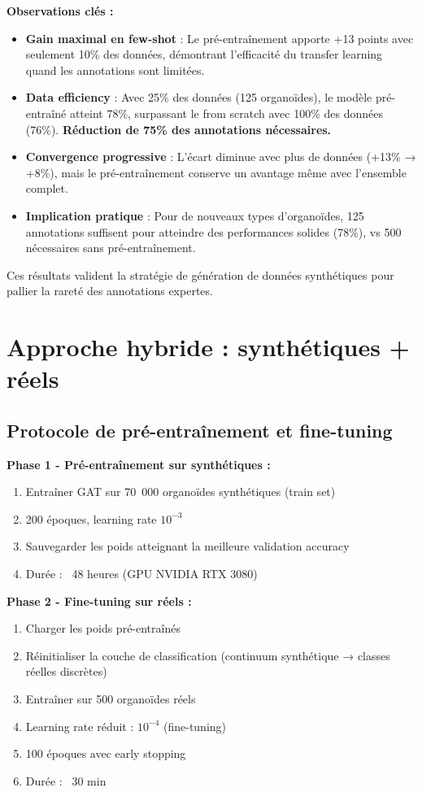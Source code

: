\textbf{Observations clés :}
\begin{itemize}
    \item \textbf{Gain maximal en few-shot} : Le pré-entraînement apporte +13 points avec seulement 10\% des données, démontrant l'efficacité du transfer learning quand les annotations sont limitées.
    
    \item \textbf{Data efficiency} : Avec 25\% des données (125 organoïdes), le modèle pré-entraîné atteint 78\%, surpassant le from scratch avec 100\% des données (76\%). \textbf{Réduction de 75\% des annotations nécessaires.}
    
    \item \textbf{Convergence progressive} : L'écart diminue avec plus de données (+13\% → +8\%), mais le pré-entraînement conserve un avantage même avec l'ensemble complet.
    
    \item \textbf{Implication pratique} : Pour de nouveaux types d'organoïdes, 125 annotations suffisent pour atteindre des performances solides (78\%), vs 500 nécessaires sans pré-entraînement.
\end{itemize}

Ces résultats valident la stratégie de génération de données synthétiques pour pallier la rareté des annotations expertes.


\section{Approche hybride : synthétiques + réels}

\subsection{Protocole de pré-entraînement et fine-tuning}

\textbf{Phase 1 - Pré-entraînement sur synthétiques :}
\begin{enumerate}
    \item Entraîner GAT sur 70~000 organoïdes synthétiques (train set)
    \item 200 époques, learning rate $10^{-3}$
    \item Sauvegarder les poids atteignant la meilleure validation accuracy
    \item Durée : ~48 heures (GPU NVIDIA RTX 3080)
\end{enumerate}

\textbf{Phase 2 - Fine-tuning sur réels :}
\begin{enumerate}
    \item Charger les poids pré-entraînés
    \item Réinitialiser la couche de classification (continuum synthétique → classes réelles discrètes)
    \item Entraîner sur 500 organoïdes réels
    \item Learning rate réduit : $10^{-4}$ (fine-tuning)
    \item 100 époques avec early stopping
    \item Durée : ~30 min
\end{enumerate}

